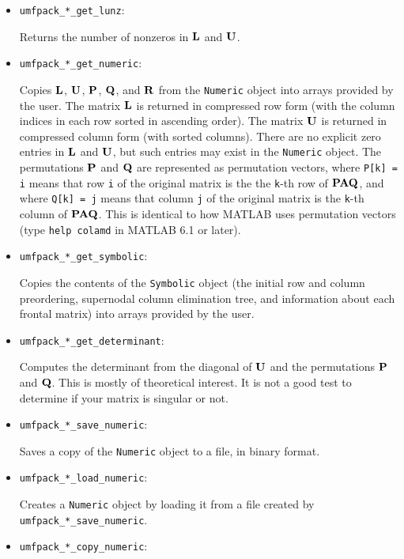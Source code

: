 \documentclass[11pt]{article}
\newcommand{\m}[1]{{\bf{#1}}}       %
\begin{document}
\begin{itemize}
\item {\tt umfpack\_*\_get\_lunz}:

    Returns the number of nonzeros in $\m{L}$ and $\m{U}$.

\item {\tt umfpack\_*\_get\_numeric}:

    Copies $\m{L}$, $\m{U}$, $\m{P}$, $\m{Q}$, and $\m{R}$
    from the {\tt Numeric} object
    into arrays provided by the user.  The matrix $\m{L}$ is returned in
    compressed row form (with the column indices in each row sorted in ascending
    order).  The matrix $\m{U}$ is returned in compressed column form (with
    sorted columns).  There are no explicit zero entries in $\m{L}$ and $\m{U}$,
    but such entries may exist in the {\tt Numeric} object.  The permutations
    $\m{P}$ and $\m{Q}$ are represented as permutation vectors, where
    {\tt P[k] = i} means that row {\tt i} of the original matrix is the
    the {\tt k}-th row of $\m{PAQ}$, and where
    {\tt Q[k] = j} means that column {\tt j} of the original matrix is the
    {\tt k}-th column of $\m{PAQ}$.  This is identical to how MATLAB uses
    permutation vectors (type {\tt help colamd} in MATLAB 6.1 or later).

\item {\tt umfpack\_*\_get\_symbolic}:

    Copies the contents of the {\tt Symbolic} object (the initial row and column
    preordering, supernodal column elimination tree, and information
    about each frontal matrix) into arrays provided by the user.

\item {\tt umfpack\_*\_get\_determinant}:

    Computes the determinant from the diagonal of $\m{U}$ and the permutations
    $\m{P}$ and $\m{Q}$.  This is mostly of theoretical interest.
    It is not a good test to determine if your matrix is singular or not.

\item {\tt umfpack\_*\_save\_numeric}:

    Saves a copy of the {\tt Numeric} object to a file, in binary format.

\item {\tt umfpack\_*\_load\_numeric}:

    Creates a {\tt Numeric} object by loading it from a file created
    by {\tt umfpack\_*\_save\_numeric}.

\item {\tt umfpack\_*\_copy\_numeric}:


\end{itemize}
\end{document}
